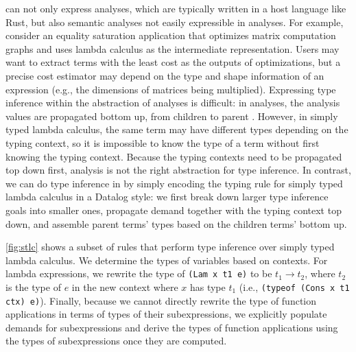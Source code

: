 
\Egglog can not only express \eclass analyses,
 which are typically written in a host language like Rust,
 but also semantic analyses not easily expressible in \eclass analyses.
For example, consider an equality saturation application
 that optimizes matrix computation graphs and uses lambda calculus
 as the intermediate representation.
Users may want to extract terms with the least cost as the outputs of optimizations,
 but a precise cost estimator may depend on the type and shape information of an expression
 (e.g., the dimensions of matrices being multiplied).
Expressing type inference within the abstraction of \eclass analyses is difficult:
 in \eclass analyses, the analysis values are propagated bottom up,
 from children to parent \eclasses.
However, in simply typed lambda calculus,
 the same term may have different types depending on the typing context,
 so it is impossible to know the type of a term without first knowing the typing context.
Because the typing contexts need to be propagated top down first,
 \eclass analysis is not the right abstraction for type inference.
In contrast,
 we can do type inference in \egglog
 by simply encoding the typing rule for simply typed lambda calculus in a Datalog style:
 we first break down larger type inference goals into smaller ones,
  propagate demand together with the typing context top down,
  and assemble parent terms' types based on the children terms' bottom up.

\autoref{fig:stlc} shows a subset of rules that perform type inference
 over simply typed lambda calculus.
We determine the types of variables based on contexts.
For lambda expressions, we rewrite the type of \lstinline{(Lam x t1 e)}
 to be $t_1\rightarrow t_2$, where $t_2$ is the type of $e$ in the new context
 where $x$ has type $t_1$ (i.e., \lstinline{(typeof (Cons x t1 ctx) e)}).
Finally, because we cannot directly rewrite the type of function applications
 in terms of types of their subexpressions,
 we explicitly populate demands for subexpressions and
 derive the types of function applications using
 the types of subexpressions once they are computed.

